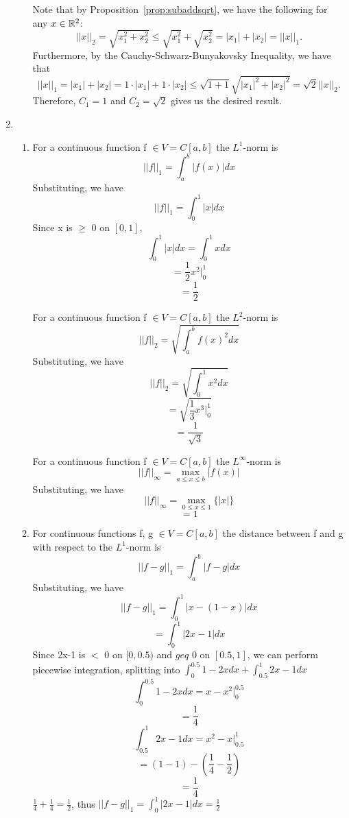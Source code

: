 \documentclass[12pt]{article}
\begin{document}
\begin{enumerate}[leftmargin=2em]
\begin{enumerate}[leftmargin=!]
        Note that by Proposition~\ref{prop:subaddsqrt}, we have the following for any $x\in \mathbb{R}^2$:
        \[||x||_{2}=\sqrt{x_1^2+x_2^2} \leq \sqrt{x_1^2}+\sqrt{x_2^2} = |x_1|+|x_2| = ||x||_{1}.\]
        Furthermore, by the Cauchy-Schwarz-Bunyakovsky Inequality, we have that
        \[||x||_{1} = |x_1|+|x_2| = 1\cdot |x_1|+1\cdot|x_2| \leq \sqrt{1+1}\sqrt{|x_1|^2+|x_2|^2} = \sqrt{2}||x||_{2}.\]
        Therefore, $C_1=1$ and $C_2 = \sqrt{2}$ gives us the desired result.
    \end{enumerate}

    \item
    \begin{enumerate}[leftmargin=!]
        \item
        For a continuous function f $\in V=C[a,b]$ the $L^1$-norm is
        \[||f||_{1}=\int_{a}^{b}|f(x)|dx\]
        Substituting, we have
        \[||f||_{1}=\int_{0}^{1}|x|dx\]
        Since x is $\geq$ 0 on $[0,1]$,
        \[\int_{0}^{1}|x|dx = \int_{0}^{1}xdx\]
        \[=\frac{1}{2}x^{2}\rvert_{0}^{1}\]
        \[= \frac{1}{2}\]

        For a continuous function f $\in V=C[a,b]$ the $L^2$-norm is
        \[||f||_{2}=\sqrt{\int_{a}^{b}f(x)^{2}dx}\]
        Substituting, we have
        \[||f||_{2}=\sqrt{\int_{0}^{1}x^{2}dx}\]
        \[=\sqrt{\frac{1}{3}x^{3}\rvert_{0}^{1}}\]
        \[=\frac{1}{\sqrt{3}}\]

        For a continuous function f $\in V=C[a,b]$ the $L^{\infty}$-norm is
        \[||f||_{\infty}=\max_{a \leq x \leq b}{|f(x)|}\]
        Substituting, we have
        \[||f||_{\infty}=\max_{0 \leq x \leq 1}\{|x|\}\]
        \[=1\]
        
        \item
        For continuous functions f, g $\in V=C[a,b]$ the distance between f and g with respect to the $L^1$-norm is
        \[||f-g||_{1}=\int_{a}^{b}|f-g|dx\]
        Substituting, we have
        \[||f-g||_{1}=\int_{0}^{1}|x-(1-x)|dx\]
        \[=\int_{0}^{1}|2x-1|dx\]
        Since 2x-1 is $<$ 0 on $[0,0.5)$ and $geq$ 0 on $[0.5,1]$, we can perform piecewise integration, splitting into $\int_{0}^{0.5}1-2xdx + \int_{0.5}^{1}2x-1dx$
        \[\int_{0}^{0.5}1-2xdx = x-x^{2}\rvert_{0}^{0.5}\]
        \[=\frac{1}{4}\]
        \[\int_{0.5}^{1}2x-1dx = x^{2}-x\rvert_{0.5}^{1}\]
        \[=(1-1)-(\frac{1}{4}-\frac{1}{2})\]
        \[=\frac{1}{4}\]
        $\frac{1}{4}+\frac{1}{4}=\frac{1}{2}$, thus $||f-g||_{1}=\int_{0}^{1}|2x-1|dx=\frac{1}{2}$ 


\end{enumerate}
\end{enumerate}
\end{document}
